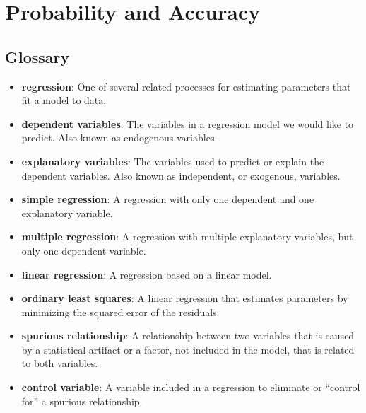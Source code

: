  \chapter{Probability and Accuracy}  \section*{Glossary} \begin{itemize}
	
	\item {\bf regression}: One of several related processes for estimating parameters
	that fit a model to data.
	
	\item {\bf dependent variables}: The variables in a regression model we would
	like to predict.  Also known as endogenous variables.
	
	\item {\bf explanatory variables}: The variables used to predict or explain
	the dependent variables.  Also known as independent, or exogenous,
	variables.
	
	\item {\bf simple regression}: A regression with only one dependent and
	one explanatory variable.
	
	\item {\bf multiple regression}: A regression with multiple explanatory
	variables, but only one dependent variable.
	
	\item {\bf linear regression}: A regression based on a linear model.
	
	\item {\bf ordinary least squares}: A linear regression that estimates
	parameters by minimizing the squared error of the residuals.
	
	\item {\bf spurious relationship}: A relationship between two variables that is 
	caused by a statistical artifact or a factor, not included in the
	model, that is related to both variables.
	
	\item {\bf control variable}: A variable included in a regression to
	eliminate or ``control for'' a spurious relationship.
	

\end{itemize}
